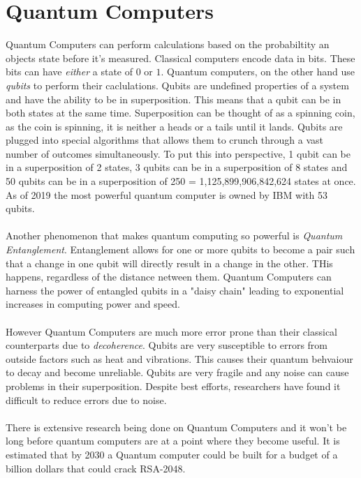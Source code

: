 \documentclass[journal]{IEEEtran}
\begin{document}
\section{Quantum Computers}
Quantum Computers can perform calculations based on the probabiltity an objects state before it's measured.
Classical computers encode data in bits. These bits can have \emph{either} a state of $0$ or $1$. Quantum computers, on the other hand
use \emph{qubits} to perform their caclulations. Qubits are undefined properties of a system and have the ability to be in superposition.
This means that a qubit can be in both states at the same time. Superposition can be thought of as a spinning coin, as the coin is spinning, 
it is neither a heads or a tails until it lands. Qubits are plugged into special algorithms that allows them to crunch through a vast number of outcomes
simultaneously. To put this into perspective, 1 qubit can be in a superposition of 2 states, 3 qubits can be in a superposition of 8 states and 
50 qubits can be in a superposition of 250 = 1,125,899,906,842,624 states at once. As of 2019 the most powerful quantum computer is owned by IBM with 53 qubits. \\ \\
Another phenomenon that makes quantum computing so powerful is \emph{Quantum Entanglement}. Entanglement allows for one or more qubits to become a pair such that
a change in one qubit will directly result in a change in the other. THis happens, regardless of the distance netween them. Quantum Computers can harness the power of
entangled qubits in a "daisy chain" leading to exponential increases in computing power and speed. \\ \\
However Quantum Computers are much more error prone than their classical counterparts due to \emph{decoherence}.
Qubits are very susceptible to errors from outside factors such 
as heat and vibrations. This causes their quantum behvaiour to decay and become unreliable. Qubits are very fragile and any noise can cause problems in their superposition.
Despite best efforts, researchers have found it difficult to reduce errors due to noise. \\ \\
There is extensive research being done on Quantum Computers and it won't be long before quantum computers are at a point where they become useful. It is estimated that by 2030 a Quantum
computer could be built for a budget of a billion dollars that could crack RSA-2048.
\end{document}
